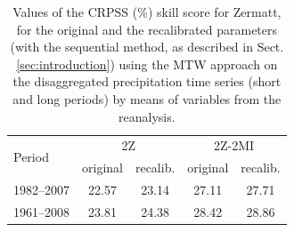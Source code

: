 \documentclass[hess, manuscript]{copernicus}
\begin{document}
\begin{table}[htb]
	\caption{Values of the CRPSS (\%) skill score for Zermatt, for the original and the recalibrated parameters (with the sequential method, as described in Sect. \ref{sec:introduction}) using the MTW approach on the disaggregated precipitation time series (short and long periods) by means of variables from the reanalysis.}
	\begin{center}
		\begin{tabular}{l c c c c}
			\hline
			\multirow{2}{*}{Period} & \multicolumn{2}{c}{2Z} & \multicolumn{ 2}{c}{2Z-2MI} \\
			& original & recalib. & original & recalib. \\
			\hline
			1982--2007 & 22.57 & 23.14 & 27.11 & 27.71 \\
			1961--2008 & 23.81 & 24.38 & 28.42 & 28.86 \\
			\hline
		\end{tabular}
	\end{center}
	\label{table:proxy_CRPSS}
\end{table}









\end{document}
